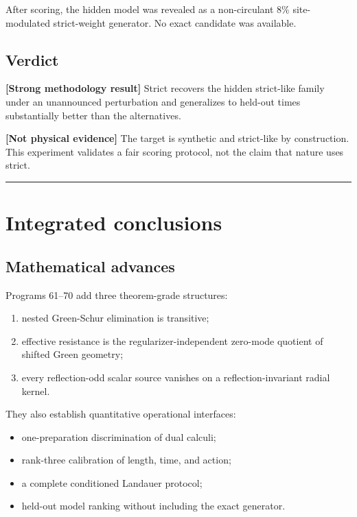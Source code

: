 \documentclass[11pt,a4paper,openany]{report}
\begin{document}
After scoring, the hidden model was revealed as a non-circulant 8\% site-modulated strict-weight generator. No exact candidate was available.

\section{Verdict}

\textbf{[Strong methodology result]} Strict recovers the hidden strict-like family under an unannounced perturbation and generalizes to held-out times substantially better than the alternatives.

\textbf{[Not physical evidence]} The target is synthetic and strict-like by construction. This experiment validates a fair scoring protocol, not the claim that nature uses strict.

\par\medskip\hrule\medskip

\chapter{Integrated conclusions}

\section{Mathematical advances}

Programs 61–70 add three theorem-grade structures:

\begin{enumerate}
\item 
nested Green-Schur elimination is transitive;

\item 
effective resistance is the regularizer-independent zero-mode quotient of shifted Green geometry;

\item 
every reflection-odd scalar source vanishes on a reflection-invariant radial kernel.

\end{enumerate}

They also establish quantitative operational interfaces:

\begin{itemize}
\item 
one-preparation discrimination of dual calculi;

\item 
rank-three calibration of length, time, and action;

\item 
a complete conditioned Landauer protocol;

\item 
held-out model ranking without including the exact generator.

\end{itemize}
\end{document}
